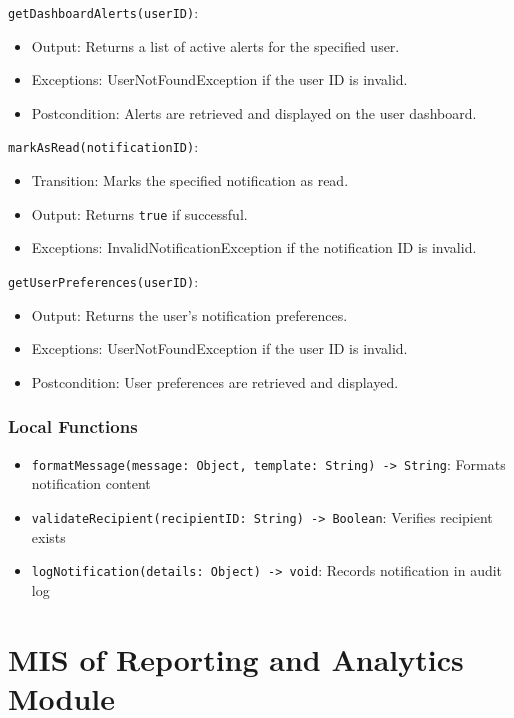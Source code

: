 \documentclass[12pt, titlepage]{article}
\begin{document}
\noindent \texttt{getDashboardAlerts(userID)}:
\begin{itemize}
    \item Output: Returns a list of active alerts for the specified user.
    \item Exceptions: UserNotFoundException if the user ID is invalid.
    \item Postcondition: Alerts are retrieved and displayed on the user dashboard.
\end{itemize}

\noindent \texttt{markAsRead(notificationID)}:
\begin{itemize}
    \item Transition: Marks the specified notification as read.
    \item Output: Returns \texttt{true} if successful.
    \item Exceptions: InvalidNotificationException if the notification ID is invalid.
\end{itemize}

\noindent \texttt{getUserPreferences(userID)}:
\begin{itemize}
    \item Output: Returns the user's notification preferences.
    \item Exceptions: UserNotFoundException if the user ID is invalid.
    \item Postcondition: User preferences are retrieved and displayed.
\end{itemize}

\subsubsection{Local Functions}
\begin{itemize}
    \item \texttt{formatMessage(message: Object, template: String) -> String}: Formats notification content
    \item \texttt{validateRecipient(recipientID: String) -> Boolean}: Verifies recipient exists
    \item \texttt{logNotification(details: Object) -> void}: Records notification in audit log
\end{itemize}

\section{MIS of Reporting and Analytics Module}
\end{document}
